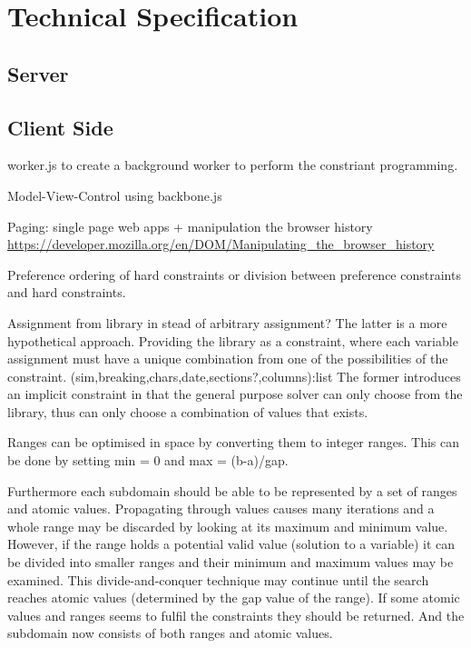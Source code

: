 \chapter{Technical Specification} %
\label{ch:implementation}


\section{Server}



\section{Client Side}

worker.js to create a background worker to perform the constriant programming.

Model-View-Control using backbone.js

Paging: single page web apps + manipulation the browser history \url{https://developer.mozilla.org/en/DOM/Manipulating_the_browser_history}

Preference ordering of hard constraints or division between preference constraints and hard constraints.

Assignment from library in stead of arbitrary assignment? The latter is a more hypothetical approach. Providing the library as a constraint, where each variable assignment must have a unique combination from one of the possibilities of the constraint.
(sim,breaking,chars,date,sections?,columns):list
The former introduces an implicit constraint in that the general purpose solver can only choose from the library, thus can only choose a combination of values that exists.

Ranges can be optimised in space by converting them to integer ranges. This can be done by setting min = 0 and max = (b-a)/gap.

Furthermore each subdomain should be able to be represented by a set of ranges and atomic values. Propagating through values causes many iterations and a whole range may be discarded by looking at its maximum and minimum value. However, if the range holds a potential valid value (solution to a variable) it can be divided into smaller ranges and their minimum and maximum values may be examined. This divide-and-conquer technique may continue until the search reaches atomic values (determined by the gap value of the range). If some atomic values and ranges seems to fulfil the constraints they should be returned. And the subdomain now consists of both ranges and atomic values.

